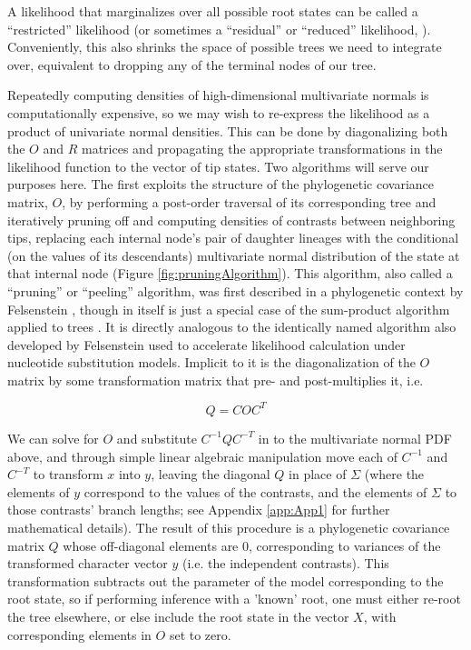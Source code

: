 A likelihood that marginalizes over all possible root states can be called a “restricted” likelihood (or sometimes a “residual” or “reduced” likelihood, \citealt{felsensteinInferringPhylogenies2004}). Conveniently, this also shrinks the space of possible trees we need to integrate over, equivalent to dropping any of the terminal nodes of our tree.

Repeatedly computing densities of high-dimensional multivariate normals is computationally expensive, so we may wish to re-express the likelihood as a product of univariate normal densities. This can be done by diagonalizing both the $O$ and $R$ matrices and propagating the appropriate transformations in the likelihood function to the vector of tip states. Two algorithms will serve our purposes here. The first exploits the structure of the phylogenetic covariance matrix, $O$, by performing a post-order traversal of its corresponding tree and iteratively pruning off and computing densities of contrasts between neighboring tips, replacing each internal node’s pair of daughter lineages with the conditional (on the values of its descendants) multivariate normal distribution of the state at that internal node (Figure \ref{fig:pruningAlgorithm}). This algorithm, also called a “pruning” or “peeling” algorithm, was first described in a phylogenetic context by Felsenstein \citeyear{felsensteinMaximumlikelihoodEstimationEvolutionary1973, felsensteinPhylogeniesComparativeMethod1985, felsensteinInferringPhylogenies2004}, though in itself is just a special case of the sum-product algorithm applied to trees \citep{hohnaProbabilisticGraphicalModel2014}. It is directly analogous to the identically named algorithm also developed by Felsenstein used to accelerate likelihood calculation under nucleotide substitution models. Implicit to it is the diagonalization of the $O$ matrix by some transformation matrix that pre- and post-multiplies it, i.e.

{\large\[Q = COC^T\]}

We can solve for $O$ and substitute $C^{-1}QC^{-T}$ in to the multivariate normal PDF above, and through simple linear algebraic manipulation move each of $C^{-1}$ and $C^{-T}$ to transform $x$ into $y$, leaving the diagonal $Q$ in place of $\Sigma$ (where the elements of $y$ correspond to the values of the contrasts, and the elements of $\Sigma$ to those contrasts' branch lengths; see Appendix \ref{app:App1} for further mathematical details). The result of this procedure is a phylogenetic covariance matrix $Q$ whose off-diagonal elements are 0, corresponding to variances of the transformed character vector $y$ (i.e. the independent contrasts). This transformation subtracts out the parameter of the model corresponding to the root state, so if performing inference with a 'known' root, one must either re-root the tree elsewhere, or else include the root state in the vector $X$, with corresponding elements in $O$ set to zero.

